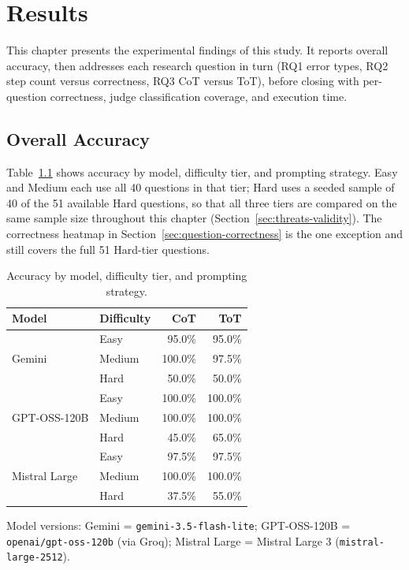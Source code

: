 \chapter{Results}
\label{chap:results}

This chapter presents the experimental findings of this study. It
reports overall accuracy, then addresses each research question in turn
(RQ1 error types, RQ2 step count versus correctness, RQ3 CoT versus ToT),
before closing with per-question correctness, judge classification
coverage, and execution time.

\section{Overall Accuracy}
\label{sec:overall-accuracy}

Table~\ref{tab:accuracy-difficulty} shows accuracy by model, difficulty
tier, and prompting strategy. Easy and Medium each use all 40 questions
in that tier; Hard uses a seeded sample of 40 of the 51 available Hard
questions, so that all three tiers are compared on the same sample size
throughout this chapter (Section~\ref{sec:threats-validity}). The
correctness heatmap in Section~\ref{sec:question-correctness} is the one
exception and still covers the full 51 Hard-tier questions.

\begin{table}[H]
  \centering
  \caption{Accuracy by model, difficulty tier, and prompting strategy.}
  \label{tab:accuracy-difficulty}
  \begin{tabular}{llrr}
    \toprule
    Model & Difficulty & CoT & ToT \\
    \midrule
    \multirow{3}{*}{Gemini} & Easy & 95.0\% & 95.0\% \\
     & Medium & 100.0\% & 97.5\% \\
     & Hard & 50.0\% & 50.0\% \\
    \midrule
    \multirow{3}{*}{GPT-OSS-120B} & Easy & 100.0\% & 100.0\% \\
     & Medium & 100.0\% & 100.0\% \\
     & Hard & 45.0\% & 65.0\% \\
    \midrule
    \multirow{3}{*}{Mistral Large} & Easy & 97.5\% & 97.5\% \\
     & Medium & 100.0\% & 100.0\% \\
     & Hard & 37.5\% & 55.0\% \\
    \bottomrule
  \end{tabular}

  \vspace{4pt}
  \footnotesize
  Model versions: Gemini = \texttt{gemini-3.5-flash-lite}; GPT-OSS-120B =
  \texttt{openai/gpt-oss-120b} (via Groq); Mistral Large = Mistral Large 3
  (\texttt{mistral-large-2512}).
\end{table}

